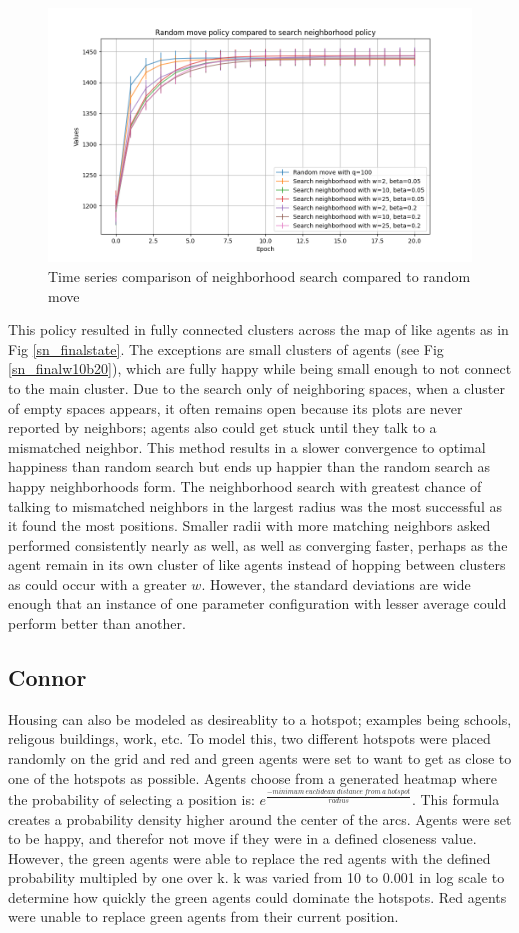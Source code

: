 \documentclass[11pt]{article}
\begin{document}
	\begin{figure}
		\centering
		\includegraphics[width=.5\textwidth]{policies02.png}
		\caption{Time series comparison of neighborhood search compared to random move}
	\end{figure}
		\vspace{-.5em} %
	This policy resulted in fully connected clusters across the map of like agents as in Fig \ref{sn_finalstate}. The exceptions are small clusters of agents (see Fig \ref{sn_finalw10b20}), which are fully happy while being small enough to not connect to the main cluster. Due to the search only of neighboring spaces, when a cluster of empty spaces appears, it often remains open because its plots are never reported by neighbors; agents also could get stuck until they talk to a mismatched neighbor. This method results in a slower convergence to optimal happiness than random search but ends up happier than the random search as happy neighborhoods form. The neighborhood search with greatest chance of talking to mismatched neighbors in the largest radius was the most successful as it found the most positions. Smaller radii with more matching neighbors asked performed consistently nearly as well, as well as converging faster, perhaps as the agent remain in its own cluster of like agents instead of hopping between  clusters as could occur with a greater $w$. However, the standard deviations are wide enough that an instance of one parameter configuration with lesser average could perform better than another.
	
	\newpage
	
	\subsection{Connor}
	Housing can also be modeled as desireablity to a hotspot; examples being schools, religous buildings, work, etc. To model this, two different hotspots were placed randomly on the grid and red and green agents were set to want to get as close to one of the hotspots as possible. Agents choose from a generated heatmap where the probability of selecting a position is: $e^{\frac{- minimum\ euclidean\ distance\ from\ a\ hotspot}{radius}}$. This formula creates a probability density higher around the center of the arcs. Agents were set to be happy, and therefor not move if they were in a defined closeness value. However, the green agents were able to replace the red agents with the defined probability multipled by one over k. k was varied from 10 to 0.001 in log scale to determine how quickly the green agents could dominate the hotspots. Red agents were unable to replace green agents from their current position.
	
\end{document}
